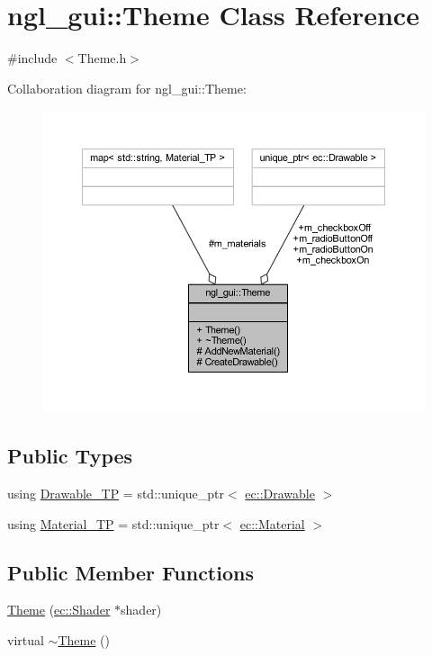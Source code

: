 \hypertarget{classngl__gui_1_1_theme}{}\section{ngl\+\_\+gui\+:\+:Theme Class Reference}
\label{classngl__gui_1_1_theme}


{\ttfamily \#include $<$Theme.\+h$>$}



Collaboration diagram for ngl\+\_\+gui\+:\+:Theme\+:
\nopagebreak
\begin{figure}[H]
\begin{center}
\leavevmode
\includegraphics[width=350pt]{classngl__gui_1_1_theme__coll__graph}
\end{center}
\end{figure}
\subsection*{Public Types}
\begin{DoxyCompactItemize}
\item 
using \mbox{\hyperlink{classngl__gui_1_1_theme_a43741a39898ef4b14443b980a2e6d67c}{Drawable\+\_\+\+TP}} = std\+::unique\+\_\+ptr$<$ \mbox{\hyperlink{classec_1_1_drawable}{ec\+::\+Drawable}} $>$
\item 
using \mbox{\hyperlink{classngl__gui_1_1_theme_a036278e436de3fbf75bce9d5a6743b9b}{Material\+\_\+\+TP}} = std\+::unique\+\_\+ptr$<$ \mbox{\hyperlink{classec_1_1_material}{ec\+::\+Material}} $>$
\end{DoxyCompactItemize}
\subsection*{Public Member Functions}
\begin{DoxyCompactItemize}
\item 
\mbox{\hyperlink{classngl__gui_1_1_theme_a402ddc15ec480f0f0a4f0ab9a459d51d}{Theme}} (\mbox{\hyperlink{classec_1_1_shader}{ec\+::\+Shader}} $\ast$shader)
\item 
virtual \mbox{\hyperlink{classngl__gui_1_1_theme_a7663964103c6d039cc8e6b49259667b9}{$\sim$\+Theme}} ()
\end{DoxyCompactItemize}
